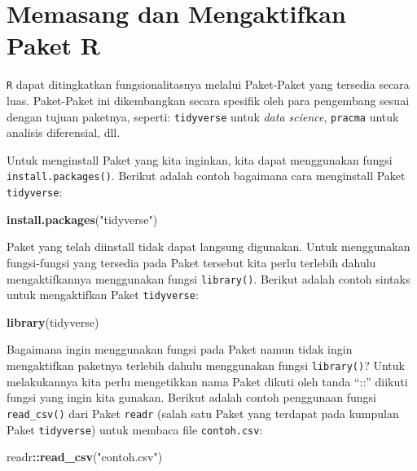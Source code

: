 \documentclass[]{book}
\newenvironment{Shaded}{\begin{snugshade}}{\end{snugshade}}
\newcommand{\KeywordTok}[1]{\textcolor[rgb]{0.13,0.29,0.53}{\textbf{#1}}}
\newcommand{\NormalTok}[1]{#1}
\newcommand{\OperatorTok}[1]{\textcolor[rgb]{0.81,0.36,0.00}{\textbf{#1}}}
\newcommand{\StringTok}[1]{\textcolor[rgb]{0.31,0.60,0.02}{#1}}
\theoremstyle{definition}
\theoremstyle{definition}
\theoremstyle{definition}
\theoremstyle{remark}
\begin{document}
\hypertarget{installlibraryR}{%
\section{Memasang dan Mengaktifkan Paket R}\label{installlibraryR}}

\texttt{R} dapat ditingkatkan fungsionalitasnya melalui Paket-Paket yang tersedia secara luas. Paket-Paket ini dikembangkan secara spesifik oleh para pengembang sesuai dengan tujuan paketnya, seperti: \texttt{tidyverse} untuk \emph{data science}, \texttt{pracma} untuk analisis diferensial, dll.

Untuk menginstall Paket yang kita inginkan, kita dapat menggunakan fungsi \texttt{install.packages()}. Berikut adalah contoh bagaimana cara menginstall Paket \texttt{tidyverse}:

\begin{Shaded}
\begin{Highlighting}[]
\KeywordTok{install.packages}\NormalTok{(}\StringTok{"tidyverse"}\NormalTok{)}
\end{Highlighting}
\end{Shaded}

Paket yang telah diinstall tidak dapat langsung digunakan. Untuk menggunakan fungsi-fungsi yang tersedia pada Paket tersebut kita perlu terlebih dahulu mengaktifkannya menggunakan fungsi \texttt{library()}. Berikut adalah contoh sintaks untuk mengaktifkan Paket \texttt{tidyverse}:

\begin{Shaded}
\begin{Highlighting}[]
\KeywordTok{library}\NormalTok{(tidyverse)}
\end{Highlighting}
\end{Shaded}

Bagaimana ingin menggunakan fungsi pada Paket namun tidak ingin mengaktifkan paketnya terlebih dahulu menggunakan fungsi \texttt{library()}? Untuk melakukannya kita perlu mengetikkan nama Paket dikuti oleh tanda ``::'' diikuti fungsi yang ingin kita gunakan. Berikut adalah contoh penggunaan fungsi \texttt{read\_csv()} dari Paket \texttt{readr} (salah satu Paket yang terdapat pada kumpulan Paket \texttt{tidyverse}) untuk membaca file \texttt{contoh.csv}:

\begin{Shaded}
\begin{Highlighting}[]
\NormalTok{readr}\OperatorTok{::}\KeywordTok{read_csv}\NormalTok{(}\StringTok{"contoh.csv"}\NormalTok{)}
\end{Highlighting}
\end{Shaded}
\end{document}
